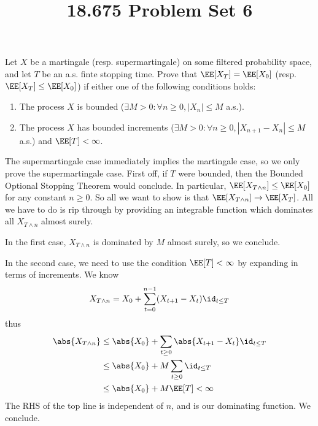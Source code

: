 \documentclass[11pt, headheight=30pt]{scrartcl}
\title{18.675 Problem Set 6}
\begin{document}
\section{}
\begin{prob*}
    Let $X$ be a martingale (resp. supermartingale) on some filtered probability space, and
    let $T$ be an a.s. finte stopping time. Prove that $\EE[X_T ] = \EE[X_0]$ (resp. $\EE[X_T ] \leq \EE[X_0]$) if either one
    of the following conditions holds:
    \begin{enumerate}
        \item The process $X$ is bounded ($\exists M > 0 : \forall n \geq 0, |X_n| \leq M$ a.s.).
        \item The process $X$ has bounded increments ($\exists M > 0 : \forall n \geq 0, |X_{n+1} - X_n| \leq M$ a.s.) and
        $\EE[T] < \infty$.
    \end{enumerate}
\end{prob*}

The supermartingale case immediately implies the martingale case,
so we only prove the supermartingale case.
First off, if $T$ were bounded, then the Bounded Optional Stopping Theorem
would conclude. In particular, $\EE[X_{T\land n}] \leq \EE[X_0]$ for any
constant $n\geq 0$. So all we want to show is that $\EE[X_{T\land n}] \to \EE[X_T]$.
All we have to do is rip through  by providing an integrable
function which dominates all $X_{T\land n}$ almost surely.

In the first case, $X_{T\land n}$ is dominated by $M$ almost surely, so we conclude.

In the second case, we need to use the condition $\EE[T] < \infty$ by expanding
in terms of increments. We know
\[
    X_{T\land n} = X_0 + \sum_{t = 0}^{n-1} (X_{t+1} - X_t)\id_{t\leq T}
\]
thus
\begin{align*}
    \abs{X_{T\land n}} &\leq \abs{X_0} + \sum_{t\geq 0} \abs{X_{t+1} - X_t}\id_{t\leq T}\\
    &\leq \abs{X_0} + M\sum_{t\geq 0} \id_{t\leq T}\\
    &\leq \abs{X_0} + M\EE[T] < \infty
\end{align*}
The RHS of the top line is independent of $n$, and is our dominating function.
We conclude.
\end{document}
